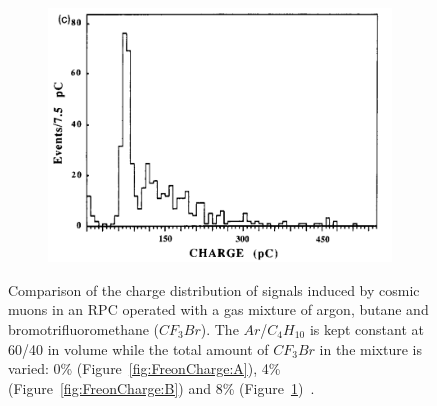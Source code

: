 \begin{figure}[H]
\begin{subfigure}{\linewidth}
			\includegraphics[width = 0.5\plotwidth]{fig/chapt4/Gas-mix-8-freon.png}\\
			\caption{\label{fig:FreonCharge:C}}
		\end{subfigure}
		\caption{\label{fig:FreonCharge} Comparison of the charge distribution of signals induced by cosmic muons in an RPC operated with a gas mixture of argon, butane and bromotrifluoromethane ($CF_3Br$). The $Ar$/$C_4H_10$ is kept constant at 60/40 in volume while the total amount of $CF_3Br$ in the mixture is varied: 0\% (Figure~\ref{fig:FreonCharge:A}), 4\% (Figure~\ref{fig:FreonCharge:B}) and 8\% (Figure~\ref{fig:FreonCharge:C})~\cite{CARDARELLI93}.}
	\end{figure}
	
